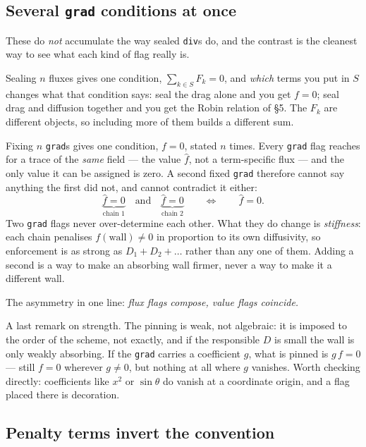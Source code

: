 \documentclass[11pt]{article}
\newcommand{\code}[1]{\texttt{#1}}
\begin{document}
\subsection*{Several \code{grad} conditions at once}

These do \emph{not} accumulate the way sealed \code{div}s do, and the contrast
is the cleanest way to see what each kind of flag really is.

Sealing $n$ fluxes gives one condition, $\sum_{k\in S}F_k=0$, and \emph{which}
terms you put in $S$ changes what that condition says: seal the drag alone and
you get $f=0$; seal drag and diffusion together and you get the Robin relation
of \S5. The $F_k$ are different objects, so including more of them builds a
different sum.

Fixing $n$ \code{grad}s gives one condition, $f=0$, stated $n$ times. Every
\code{grad} flag reaches for a trace of the \emph{same} field --- the value
$\widehat f$, not a term-specific flux --- and the only value it can be assigned
is zero. A second fixed \code{grad} therefore cannot say anything the first did
not, and cannot contradict it either:
\begin{equation}
  \underbrace{\widehat f = 0}_{\text{chain }1}
  \quad\text{and}\quad
  \underbrace{\widehat f = 0}_{\text{chain }2}
  \qquad\Longleftrightarrow\qquad
  \widehat f = 0 .
\end{equation}
Two \code{grad} flags never over-determine each other. What they do change is
\emph{stiffness}: each chain penalises $f(\text{wall})\ne0$ in proportion to its
own diffusivity, so enforcement is as strong as $D_1+D_2+\dots$ rather than any
one of them. Adding a second is a way to make an absorbing wall firmer, never a
way to make it a different wall.

The asymmetry in one line: \emph{flux flags compose, value flags coincide.}

A last remark on strength. The pinning is weak, not algebraic: it is imposed to
the order of the scheme, not exactly, and if the responsible $D$ is small the
wall is only weakly absorbing. If the \code{grad} carries a coefficient $g$,
what is pinned is $g\,f=0$ --- still $f=0$ wherever $g\ne0$, but nothing at all
where $g$ vanishes. Worth checking directly: coefficients like $x^2$ or
$\sin\theta$ do vanish at a coordinate origin, and a flag placed there is
decoration.

\subsection*{Penalty terms invert the convention}
\end{document}
